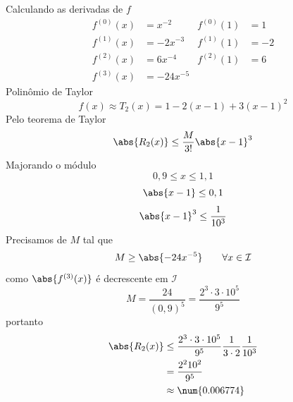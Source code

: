 \begin{exercises}
\begin{exercise}
\begin{answer}
\begin{alphalist}
			\item Calculando as derivadas de $f$
			\begin{align*}
				f^{(0)}(x) & =    x^{-2} & f^{(0)}(1) & =  1 \\
				f^{(1)}(x) & = -2 x^{-3} & f^{(1)}(1) & = -2 \\
				f^{(2)}(x) & =  6 x^{-4} & f^{(2)}(1) & =  6 \\
				f^{(3)}(x) & =-24 x^{-5} &
			\end{align*}
			Polinômio de Taylor
			\[ f(x) \approx T_2(x) = 1-2(x-1) + 3(x-1)^2 \]
			Pelo teorema de Taylor
			\[ \abs{R_2(x)} \leq \frac{M}{3!}\abs{x-1}^3 \]
			Majorando o módulo
			\[ 0,9 \leq x \leq 1,1 \]
			\[ \abs{x-1}   \leq 0,1 \]
			\[ \abs{x-1}^3 \leq \frac{1}{10^3} \]
			Precisamos de $M$ tal que
			\[ M \geq \abs{-24 x^{-5}}  \qquad \forall x\in \mathcal{I} \]
			como $\abs{f^{(3)}(x)}$ é decrescente em $\mathcal{I}$
			\[ M = \frac{24}{(0,9)^5} = \frac{2^3\cdot 3\cdot 10^5}{9^5} \]
			portanto
			\begin{align*}
				\abs{R_2(x)}
				& \leq \frac{2^3\cdot 3\cdot 10^5}{9^5}
				\frac{1}{3\cdot 2}
				\frac{1}{10^3} \\
				& = \frac{2^2 10^2}{9^5}  \\
				& \approx \num{0.006774}
			\end{align*}


\end{alphalist}
\end{answer}
\end{exercise}
\end{exercises}
